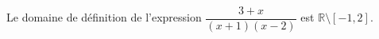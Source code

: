 Le domaine de définition de l'expression $\dfrac{3+x}{(x+1)(x-2)}$ est $\mathbb R \setminus [-1,2]$.

\begin{reponses}
\end{reponses}

